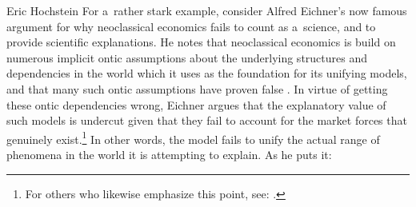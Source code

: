 \begin{artengenv}{Eric Hochstein}
For a~rather stark example, consider Alfred Eichner's now famous argument for why neoclassical economics fails to count as a~science, and to provide scientific explanations. He notes that neoclassical economics is build on numerous implicit ontic assumptions about the underlying structures and dependencies in the world which it uses as the foundation for its unifying models, and that many such ontic assumptions have proven false
\parencite[for discussion of such incorrect ontic comments][p.511]{eichner_why_1983}. %
 In virtue of getting these ontic dependencies wrong, Eichner argues that the explanatory value of such models is undercut given that they fail to account for the market forces that genuinely exist.\footnote{For others who likewise emphasize this point, see: 
\parencites[][]{hall_need_2001}[][]{hausman_why_2008}[][]{gills_appallingly_2022}.%
} In other words, the model fails to unify the actual range of phenomena in the world it is attempting to explain. As he puts it:



\end{artengenv}
